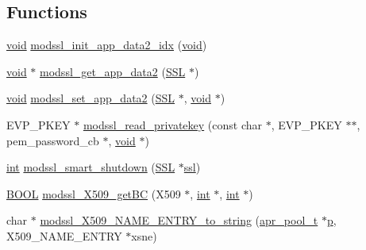 \subsection*{Functions}
\begin{DoxyCompactItemize}
\item 
\hyperlink{group__MOD__ISAPI_gacd6cdbf73df3d9eed42fa493d9b621a6}{void} \hyperlink{group__MOD__SSL__UTIL_ga1e6f698e376d307e5826cf96eae59708}{modssl\+\_\+init\+\_\+app\+\_\+data2\+\_\+idx} (\hyperlink{group__MOD__ISAPI_gacd6cdbf73df3d9eed42fa493d9b621a6}{void})
\item 
\hyperlink{group__MOD__ISAPI_gacd6cdbf73df3d9eed42fa493d9b621a6}{void} $\ast$ \hyperlink{group__MOD__SSL__UTIL_ga1bcee252b873bbf1f10920827802303c}{modssl\+\_\+get\+\_\+app\+\_\+data2} (\hyperlink{group__MOD__SSL_gac05889312301718b3fc106564942ad68}{S\+SL} $\ast$)
\item 
\hyperlink{group__MOD__ISAPI_gacd6cdbf73df3d9eed42fa493d9b621a6}{void} \hyperlink{group__MOD__SSL__UTIL_ga9474414be52ebb8768e3023968097bc5}{modssl\+\_\+set\+\_\+app\+\_\+data2} (\hyperlink{group__MOD__SSL_gac05889312301718b3fc106564942ad68}{S\+SL} $\ast$, \hyperlink{group__MOD__ISAPI_gacd6cdbf73df3d9eed42fa493d9b621a6}{void} $\ast$)
\item 
E\+V\+P\+\_\+\+P\+K\+EY $\ast$ \hyperlink{group__MOD__SSL__UTIL_ga82752d8eb9f5dab0b40d7b18d741e3bc}{modssl\+\_\+read\+\_\+privatekey} (const char $\ast$, E\+V\+P\+\_\+\+P\+K\+EY $\ast$$\ast$, pem\+\_\+password\+\_\+cb $\ast$, \hyperlink{group__MOD__ISAPI_gacd6cdbf73df3d9eed42fa493d9b621a6}{void} $\ast$)
\item 
\hyperlink{pcre_8txt_a42dfa4ff673c82d8efe7144098fbc198}{int} \hyperlink{group__MOD__SSL__UTIL_gac9f72fcff0b63162c3be9840dd308315}{modssl\+\_\+smart\+\_\+shutdown} (\hyperlink{group__MOD__SSL_gac05889312301718b3fc106564942ad68}{S\+SL} $\ast$\hyperlink{group__MOD__SSL_ga91d808d6c1c01029f9c9260b9b69a437}{ssl})
\item 
\hyperlink{pcre__internal_8h_a050c65e107f0c828f856a231f4b4e788}{B\+O\+OL} \hyperlink{group__MOD__SSL__UTIL_ga864fc6f3f3d496b62b5f0ba5b61f9eb3}{modssl\+\_\+\+X509\+\_\+get\+BC} (X509 $\ast$, \hyperlink{pcre_8txt_a42dfa4ff673c82d8efe7144098fbc198}{int} $\ast$, \hyperlink{pcre_8txt_a42dfa4ff673c82d8efe7144098fbc198}{int} $\ast$)
\item 
char $\ast$ \hyperlink{group__MOD__SSL__UTIL_ga2892cbff75bedf65cf0731d337684894}{modssl\+\_\+\+X509\+\_\+\+N\+A\+M\+E\+\_\+\+E\+N\+T\+R\+Y\+\_\+to\+\_\+string} (\hyperlink{structapr__pool__t}{apr\+\_\+pool\+\_\+t} $\ast$\hyperlink{group__APACHE__CORE__MPM_ga5cd91701e5c167f2b1a38e70ab57817e}{p}, X509\+\_\+\+N\+A\+M\+E\+\_\+\+E\+N\+T\+RY $\ast$xsne)
$$
\end{DoxyCompactItemize}
